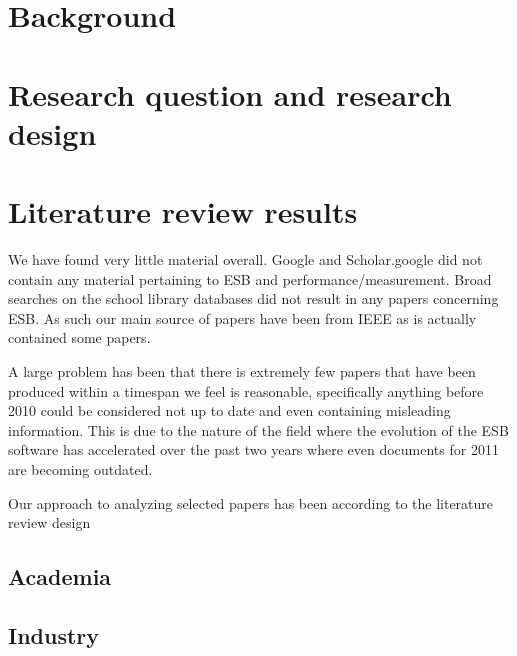 \documentclass{llncs}
\begin{document}
\section{Background}
\label{sec:background}

\section{Research question and research design}
\label{sec:method}
\section{Literature review results}
\label{sec:litrev}

We have found very little material overall. Google and Scholar.google did not contain any material pertaining to ESB and performance/measurement. Broad searches on the school library databases did not result in any papers concerning ESB. As such our main source of papers have been from IEEE as is actually contained some papers.

A large problem has been that there is extremely few papers that have been produced within a timespan we feel is reasonable, specifically anything before 2010 could be considered not up to date and even containing misleading information. This is due to the nature of the field where the evolution of the ESB software has accelerated over the past two years where even documents for 2011 are becoming outdated.


Our approach to analyzing selected papers has been according to the literature review design


\subsection{Academia}
\subsection{Industry}
\end{document}
